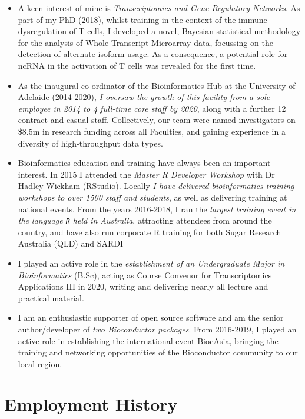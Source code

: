 \documentclass[11pt,a4paper,]{moderncv}
\providecommand{\tightlist}{%
	\setlength{\itemsep}{0pt}\setlength{\parskip}{0pt}}
\begin{document}
\begin{itemize}
\tightlist
\item
  A keen interest of mine is \emph{Transcriptomics and Gene Regulatory
  Networks}. As part of my PhD (2018), whilst training in the context of
  the immune dysregulation of T cells, I developed a novel, Bayesian
  statistical methodology for the analysis of Whole Transcript
  Microarray data, focussing on the detection of alternate isoform
  usage. As a consequence, a potential role for ncRNA in the activation
  of T cells was revealed for the first time.
\item
  As the inaugural co-ordinator of the Bioinformatics Hub at the
  University of Adelaide (2014-2020), \emph{I oversaw the growth of this
  facility from a sole employee in 2014 to 4 full-time core staff by
  2020}, along with a further 12 contract and casual staff.
  Collectively, our team were named investigators on \$8.5m in research
  funding across all Faculties, and gaining experience in a diversity of
  high-throughput data types.
\item
  Bioinformatics education and training have always been an important
  interest. In 2015 I attended the \emph{Master R Developer Workshop}
  with Dr Hadley Wickham (RStudio). Locally \emph{I have delivered
  bioinformatics training workshops to over 1500 staff and students}, as
  well as delivering training at national events. From the years
  2016-2018, I ran the \emph{largest training event in the language
  \texttt{R} held in Australia}, attracting attendees from around the
  country, and have also run corporate R training for both Sugar
  Research Australia (QLD) and SARDI
\item
  I played an active role in the \emph{establishment of an Undergraduate
  Major in Bioinformatics} (B.Sc), acting as Course Convenor for
  Transcriptomics Applications III in 2020, writing and delivering
  nearly all lecture and practical material.
\item
  I am an enthusiastic supporter of open source software and am the
  senior author/developer of \emph{two Bioconductor packages}. From
  2016-2019, I played an active role in establishing the international
  event BiocAsia, bringing the training and networking opportunities of
  the Bioconductor community to our local region.
\end{itemize}

\small

\hypertarget{employment-history}{%
\section{Employment History}\label{employment-history}}
\end{document}

